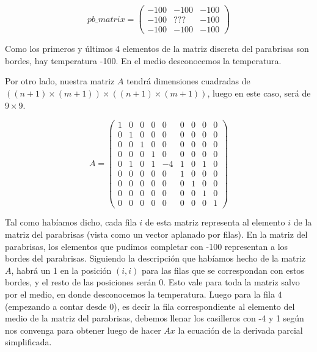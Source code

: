 \[ pb\_matrix = \left( \begin{array}{ccc}
-100 & -100 & -100 \\
-100 & ??? & -100 \\
-100 & -100 & -100 
\end{array} \right)\] 

\vspace{\baselineskip}

Como los primeros y últimos 4 elementos de la matriz discreta del parabrisas son bordes, hay temperatura -100. En el medio desconocemos la temperatura.

Por otro lado, nuestra matriz $A$ tendrá dimensiones cuadradas de $((n+1) \times (m+1)) \times  ((n+1) \times (m+1))$, luego en este caso, será de $9 \times 9$.

\vspace{\baselineskip}

\[A = \left( \begin{array}{ccccccccc}
1 & 0 & 0 & 0 & 0 & 0 & 0 & 0 & 0 \\
0 & 1 & 0 & 0 & 0 & 0 & 0 & 0 & 0 \\
0 & 0 & 1 & 0 & 0 & 0 & 0 & 0 & 0 \\ 
0 & 0 & 0 & 1 & 0 & 0 & 0 & 0 & 0 \\
0 & 1 & 0 & 1 & -4 & 1 & 0 & 1 & 0 \\
0 & 0 & 0 & 0 & 0 & 1 & 0 & 0 & 0 \\ 
0 & 0 & 0 & 0 & 0 & 0 & 1 & 0 & 0 \\
0 & 0 & 0 & 0 & 0 & 0 & 0 & 1 & 0 \\
0 & 0 & 0 & 0 & 0 & 0 & 0 & 0 & 1
\end{array} \right)\] 

\vspace{\baselineskip}

Tal como habíamos dicho, cada fila $i$ de esta matriz representa al elemento $i$ de la matriz del parabrisas (vista como un vector aplanado por filas). En la matriz del parabrisas, los elementos que pudimos completar con -100 representan a los bordes del parabrisas. Siguiendo la descripción que habíamos hecho de la matriz $A$, habrá un 1 en la posición $(i,i)$ para las filas que se correspondan con estos bordes, y el resto de las posiciones serán 0. Esto vale para toda la matriz salvo por el medio, en donde desconocemos la temperatura. Luego para la fila $4$ (empezando a contar desde 0), es decir la fila correspondiente al elemento del medio de la matriz del parabrisas, debemos llenar los casilleros con -4 y 1 según nos convenga para obtener luego de hacer $Ax$ la ecuación de la derivada parcial simplificada.

